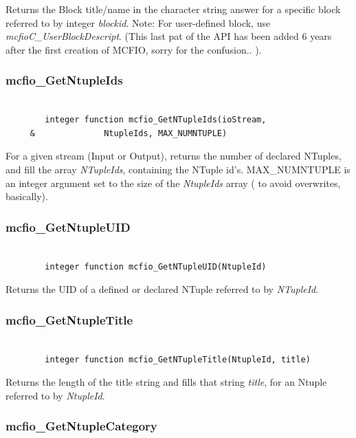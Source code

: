 Returns the Block title/name in the character string answer
for a specific block referred to by integer {\em blockid}.
Note: For user-defined block, use {\em mcfioC\_UserBlockDescript}.
(This last pat of the API has been added 6 years after the first creation
of MCFIO, sorry for the confusion.. ).

\subsubsection{mcfio\_GetNtupleIds}

\begin{verbatim}

        integer function mcfio_GetNTupleIds(ioStream,
     &              NtupleIds, MAX_NUMNTUPLE)

\end{verbatim}

For a given stream (Input or Output), returns the number of declared
NTuples, and fill the array {\em NTupleIds}, containing the NTuple id's.
MAX\_NUMNTUPLE is an integer argument set to the size of the {\em NtupleIds}
array ( to avoid overwrites, basically).


\subsubsection{mcfio\_GetNtupleUID}

\begin{verbatim}

        integer function mcfio_GetNTupleUID(NtupleId)

\end{verbatim}

Returns the UID of a defined or declared NTuple referred to by {\em
NTupleId}.


\subsubsection{mcfio\_GetNtupleTitle}

\begin{verbatim}

        integer function mcfio_GetNTupleTitle(NtupleId, title)

\end{verbatim}

Returns the length of the title string and fills that string {\em
title}, for an Ntuple referred to by {\em NtupleId}.

\subsubsection{mcfio\_GetNtupleCategory}

